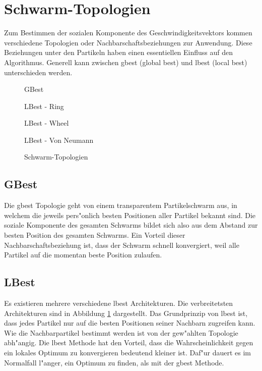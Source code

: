 \section{Schwarm-Topologien}
Zum Bestimmen der sozialen Komponente des Geschwindigkeitsvektors
kommen verschiedene Topologien oder Nachbarschaftsbeziehungen zur
Anwendung. Diese Beziehungen unter den Partikeln haben einen essentiellen
Einfluss auf den Algorithmus. Generell kann zwischen gbest (global best)
und lbest (local best) unterschieden werden.

\begin{figure}[htbp]
	\centering
	\begin{minipage}{4cm}
		\centering
		GBest
	\end{minipage}
	\begin{minipage}{4cm}
		\centering
		LBest - Ring
	\end{minipage}
	\begin{minipage}{4cm}
		\centering
		LBest - Wheel
	\end{minipage}
	\begin{minipage}{4cm}
		\centering
		LBest - Von Neumann
	\end{minipage}
	\caption{Schwarm-Topologien}
	\label{schwarm-topologien}
\end{figure}

\subsection{GBest}
Die gbest Topologie geht von einem transparentem Partikelschwarm aus,
in welchem die jeweils pers"onlich besten Positionen aller Partikel
bekannt sind. Die soziale Komponente des gesamten Schwarms bildet sich
also aus dem Abstand zur besten Position des gesamten Schwarms. Ein
Vorteil dieser Nachbarschaftsbeziehung ist, dass der Schwarm schnell
konvergiert, weil alle Partikel auf die momentan beste Position zulaufen.

\subsection{LBest}
Es existieren mehrere verschiedene lbest Architekturen. Die verbreitetsten
Architekturen sind in Abbildung \ref{schwarm-topologien} dargestellt. Das
Grundprinzip von lbest ist, dass jedes Partikel nur auf die besten
Positionen seiner Nachbarn zugreifen kann. Wie die Nachbarpartikel
bestimmt werden ist von der gew"ahlten Topologie abh"angig. Die lbest
Methode hat den Vorteil, dass die Wahrscheinlichkeit gegen ein lokales
Optimum zu konvergieren bedeutend kleiner ist. Daf"ur dauert es im
Normalfall l"anger, ein Optimum zu finden, als mit der gbest Methode.

